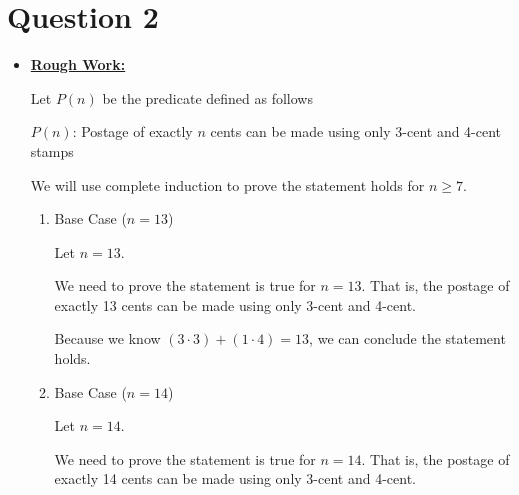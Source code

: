\documentclass[12pt]{article}
\begin{document}
\section*{Question 2}
\begin{itemize}
    \item

    \bigskip

    \begin{mdframed}
        \underline{\textbf{Rough Work:}}

        \bigskip

        Let $P(n)$ be the predicate defined as follows

        \bigskip

        \begin{center}
            $P(n)$: Postage of exactly $n$ cents can be made using only 3-cent and 4-cent stamps
        \end{center}

        \bigskip

        We will use complete induction to prove the statement holds for $n \geq 7$.

        \begin{enumerate}[1.]
            \item Base Case ($n = 13$)

            \begin{mdframed}
            Let $n = 13$.

            \bigskip

            We need to prove the statement is true for $n = 13$. That is, the
            postage of exactly 13 cents can be made using only 3-cent and 4-cent.

            \bigskip

            Because we know $(3 \cdot 3) + (1 \cdot 4)=13$, we can conclude the statement holds.

            \end{mdframed}

            \item Base Case ($n = 14$)

            \begin{mdframed}
            Let $n = 14$.

            \bigskip

            We need to prove the statement is true for $n = 14$. That is, the
            postage of exactly 14 cents can be made using only 3-cent and 4-cent.

            \bigskip


\end{mdframed}
\end{enumerate}
\end{mdframed}
\end{itemize}
\end{document}
